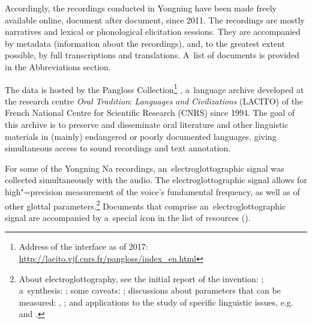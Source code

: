 Accordingly, the recordings conducted in Yongning have been made freely available
online, document after document, since 2011. The recordings are mostly
narratives and lexical or phonological elicitation sessions. They are accompanied by metadata
(information about the recordings), and, to the greatest extent possible, by full transcriptions
and translations. A~list of documents is provided in the Abbreviations section.

The data is hosted by the Pangloss Collection\footnote{Address of the interface as of 2017: \url{http://lacito.vjf.cnrs.fr/pangloss/index\_en.html}}
\citep{michailovskyetal2014}, a~language archive developed at the
research centre \textit{Oral} \textit{Tradition}: \textit{Languages} \textit{and}
\textit{Civilizations} (LACITO) of the {French} National Centre for Scientific Research (CNRS) since
1994. The goal of this archive is to preserve and disseminate oral
literature and other linguistic materials in (mainly) endangered or poorly documented languages,
giving simultaneous access to sound recordings and text annotation. 

For some of the Yongning Na recordings, an~electroglottographic signal was collected simultaneously
with the audio. The electroglottographic signal allows for
high"=precision measurement of the voice’s fundamental frequency, as well as of other glottal
parameters.\footnote{About electroglottography, see the initial report of the invention: \citet{fabre1957};
a~synthesis: \citet{baken1992}; some caveats: \citet{orlikoff1998}; discussions about parameters
that can be measured: \citet{henrichetal2004b}, \citet{michaud2004b}; and applications to the study of specific linguistic issues,
e.g.~\citet{brunelleetal2010} and \citet{kuangetal2014}.} Documents that comprise
an~electroglottographic signal are accompanied by a~special icon in the list of resources (). 


